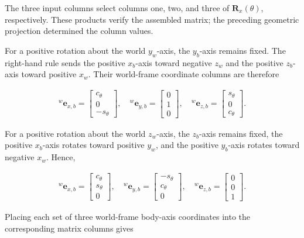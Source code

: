 \documentclass[
  australian,
  12pt,
  letterpaper,
  DIV=11,
  numbers=noendperiod,
  twoside]{scrreprt}
\begin{document}
The three input columns select columns one, two, and three of
\(\mathbf R_x(\theta)\), respectively. These products verify the
assembled matrix; the preceding geometric projection determined the
column values.

For a positive rotation about the world \(y_w\)-axis, the \(y_b\)-axis
remains fixed. The right-hand rule sends the positive \(x_b\)-axis
toward negative \(z_w\) and the positive \(z_b\)-axis toward positive
\(x_w\). Their world-frame coordinate columns are therefore

\[
\begin{aligned}
{}^{w}\mathbf e_{x,b}
=
\begin{bmatrix}
c_\theta\\0\\-s_\theta
\end{bmatrix},\quad
{}^{w}\mathbf e_{y,b}
=
\begin{bmatrix}
0\\1\\0
\end{bmatrix},\quad
{}^{w}\mathbf e_{z,b}
=
\begin{bmatrix}
s_\theta\\0\\c_\theta
\end{bmatrix}.
\end{aligned}
\]

For a positive rotation about the world \(z_w\)-axis, the \(z_b\)-axis
remains fixed, the positive \(x_b\)-axis rotates toward positive
\(y_w\), and the positive \(y_b\)-axis rotates toward negative \(x_w\).
Hence,

\[
\begin{aligned}
{}^{w}\mathbf e_{x,b}
=
\begin{bmatrix}
c_\theta\\s_\theta\\0
\end{bmatrix},\quad
{}^{w}\mathbf e_{y,b}
=
\begin{bmatrix}
-s_\theta\\c_\theta\\0
\end{bmatrix},\quad
{}^{w}\mathbf e_{z,b}
=
\begin{bmatrix}
0\\0\\1
\end{bmatrix}.
\end{aligned}
\]

Placing each set of three world-frame body-axis coordinates into the
corresponding matrix columns gives
\end{document}
